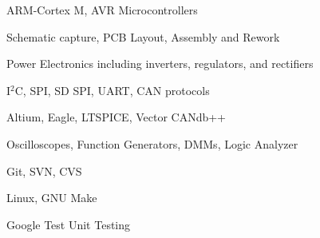 \begin{cvskillscolumn}

                {\item ARM-Cortex M, AVR Microcontrollers
                 \item Schematic capture, PCB Layout, Assembly and Rework
                 \item Power Electronics including inverters, regulators, and rectifiers
                 \item I$^2$C, SPI, SD SPI, UART, CAN protocols}
                {\item Altium, Eagle, LTSPICE, Vector CANdb++
                 \item Oscilloscopes, Function Generators, DMMs, Logic Analyzer
                 \item Git, SVN, CVS
                 \item Linux, GNU Make
                 \item Google Test Unit Testing}
\end{cvskillscolumn}
